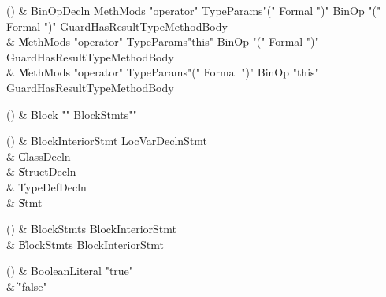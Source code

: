 \begin{bbgrammarappendix}{4.0in}

() & BinOpDecln \label{prod:BinOpDecln}  \: MethMods \xcd"operator" TypeParams\opt \xcd"(" Formal  \xcd")" BinOp \xcd"(" Formal  \xcd")" Guard\opt HasResultType\opt MethodBody  \\

 &    \| MethMods \xcd"operator" TypeParams\opt \xcd"this" BinOp \xcd"(" Formal  \xcd")" Guard\opt HasResultType\opt MethodBody \\
 &    \| MethMods \xcd"operator" TypeParams\opt \xcd"(" Formal  \xcd")" BinOp \xcd"this" Guard\opt HasResultType\opt MethodBody \\

\end{bbgrammarappendix}

\begin{bbgrammarappendix}{4.5in}

() & Block \label{prod:Block}  \: \xcd"{" BlockStmts\opt \xcd"}"  \\


\end{bbgrammarappendix}

\begin{bbgrammarappendix}{3.3in}

() & BlockInteriorStmt \label{prod:BlockInteriorStmt}  \: LocVarDeclnStmt  \\

 &    \| ClassDecln \\
 &    \| StructDecln \\
 &    \| TypeDefDecln \\
 &    \| Stmt \\

\end{bbgrammarappendix}

\begin{bbgrammarappendix}{4.0in}

() & BlockStmts \label{prod:BlockStmts}  \: BlockInteriorStmt  \\

 &    \| BlockStmts BlockInteriorStmt \\

\end{bbgrammarappendix}

\begin{bbgrammarappendix}{3.6in}

() & BooleanLiteral \label{prod:BooleanLiteral}  \: \xcd"true"   \\

 &    \| \xcd"false"  \\

\end{bbgrammarappendix}

